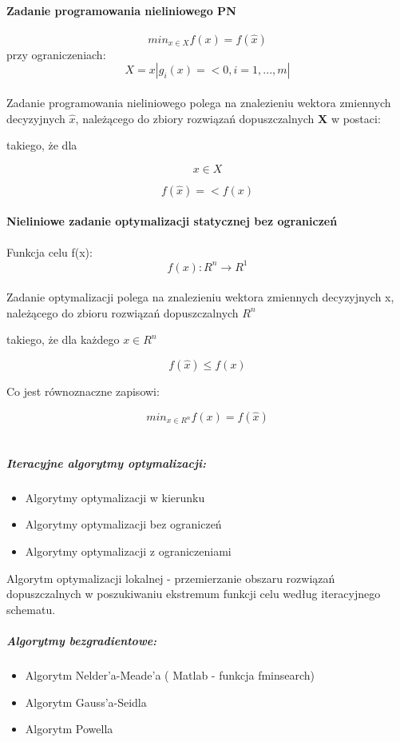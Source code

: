 \documentclass[a4paper,twoside]{report}
\begin{document}
\paragraph{Zadanie programowania nieliniowego PN}

$$min_{x \in X} f(x) = f(\hat{x})$$
przy ograniczeniach:
$$X={x|g_i(x)=<0, i=1,...,m|}$$ 
\\
Zadanie programowania nieliniowego polega na znalezieniu wektora zmiennych decyzyjnych $\hat{x}$, należącego do zbiory rozwiązań dopuszczalnych \textbf{X} w postaci: 

takiego, że dla

$$x \in X$$

$$f(\hat{x})=<f(x)$$


\paragraph{Nieliniowe zadanie optymalizacji statycznej bez ograniczeń}


Funkcja celu f(x):
$$f(x):R^n \longrightarrow R^1$$
\\
Zadanie optymalizacji polega na znalezieniu wektora zmiennych decyzyjnych x, należącego do zbioru rozwiązań dopuszczalnych $R^n$

takiego, że dla każdego $ x \in R^n $


$$ f(\hat{x})\le f(x) $$

Co jest równoznaczne zapisowi:

$$min_{x \in R^n} f(x) = f(\hat{x})$$
\\
\subparagraph{Iteracyjne algorytmy optymalizacji:}
\begin{itemize}
\item Algorytmy optymalizacji w kierunku
\item Algorytmy optymalizacji bez ograniczeń
\item Algorytmy optymalizacji z ograniczeniami
\end{itemize}
Algorytm optymalizacji lokalnej - przemierzanie obszaru rozwiązań dopuszczalnych w poszukiwaniu ekstremum funkcji celu według iteracyjnego schematu.

\subparagraph{Algorytmy bezgradientowe:}
\begin{itemize}
\item Algorytm Nelder’a-Meade’a ( Matlab - funkcja fminsearch)
\item Algorytm Gauss’a-Seidla
\item Algorytm Powella 
\end{itemize}
\end{document}
